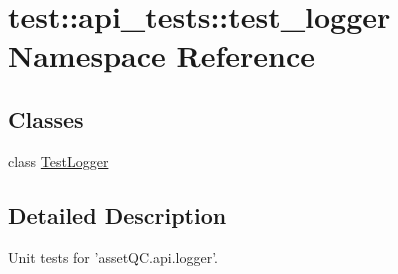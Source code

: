 \hypertarget{namespacetest_1_1api__tests_1_1test__logger}{\section{test\-:\-:api\-\_\-tests\-:\-:test\-\_\-logger \-Namespace \-Reference}
\label{d1/d71/namespacetest_1_1api__tests_1_1test__logger}
}
\subsection*{\-Classes}
\begin{DoxyCompactItemize}
\item 
class \hyperlink{classtest_1_1api__tests_1_1test__logger_1_1TestLogger}{\-Test\-Logger}
\end{DoxyCompactItemize}


\subsection{\-Detailed \-Description}
\begin{DoxyVerb}
Unit tests for 'assetQC.api.logger'.
\end{DoxyVerb}
 